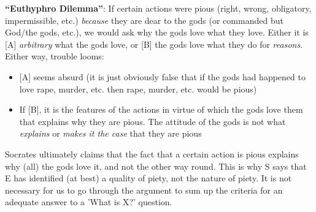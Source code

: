 \documentclass[10 pt]{article}
\begin{document}
\noindent \textbf{``Euthyphro Dilemma''}: If certain actions were pious (right, wrong, obligatory, impermissible, etc.) \emph{because} they are dear to the gods (or commanded but God/the gods, etc.), we would ask why the gods love what they love. Either it is [A] \emph{arbitrary} what the gods love, or [B] the gods love what they do for \emph{reasons}. Either way, trouble looms:\begin{itemize}\item{[A] seems absurd (it is just obviously false that if the gods had happened to love rape, murder, etc. then rape, murder, etc. would be pious)}\item{If [B], it is the features of the actions in virtue of which the gods love them that explains why they are pious. The attitude of the gods is not what \emph{explains} or \emph{makes it the case} that they are pious\\} \end{itemize} 


\noindent Socrates ultimately claims that the fact that a certain action is pious explains why (all) the gods love it, and not the other way round. This is why S says that E has identified (at best) a quality of piety, not the nature of piety. It is not necessary for us to go through the argument to sum up the criteria for an adequate answer to a 'What is X?' question. 


\end{document}
